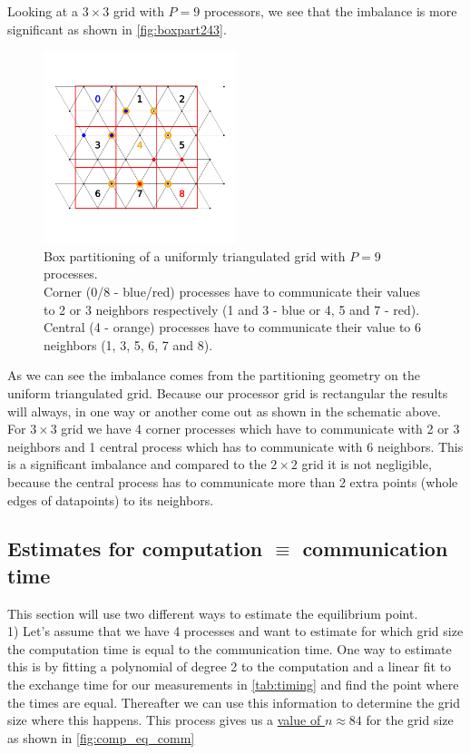 Looking at a $3\times3$ grid with $P=9$ processors, we see that the imbalance is more significant as shown in \autoref{fig:boxpart243}.\\
\begin{figure}[H]
    \centering
    \includegraphics[width=0.5\textwidth]{../fig/lab2/grid_3x3_partition.png}
    \caption{Box partitioning of a uniformly triangulated grid with $P=9$ processes.\\
    Corner (0/8 - blue/red) processes have to communicate their values to 2 or 3 neighbors respectively (1 and 3 - blue or 4, 5 and 7 - red).\\
    Central (4 - orange) processes have to communicate their value to 6 neighbors (1, 3, 5, 6, 7 and 8).}
    \label{fig:boxpart243}
\end{figure}
As we can see the imbalance comes from the partitioning geometry on the uniform triangulated grid. Because our processor grid is rectangular the results will always, in one way or another come out as shown in the schematic above.\\
For $3\times3$ grid we have 4 corner processes which have to communicate with 2 or 3 neighbors and 1 central process which has to communicate with 6 neighbors. This is a significant imbalance and compared to the $2\times2$ grid it is not negligible, because the central process has to communicate more than 2 extra points (whole edges of datapoints) to its neighbors.\\
\subsection{Estimates for computation $\equiv$ communication time}
 This section will use two different ways to estimate the equilibrium point.\\

1) Let's assume that we have 4 processes and want to estimate for which grid size the computation time is equal to the communication time. 
One way to estimate this is by fitting a polynomial of degree 2 to the computation and a linear fit to the exchange time for our measurements in \autoref{tab:timing} and find the point where the times are equal. Thereafter we can use this information to determine the grid size where this happens. This process gives us a \underline{value of $n\approx84$} for the grid size as shown in \autoref{fig:comp_eq_comm}\\

